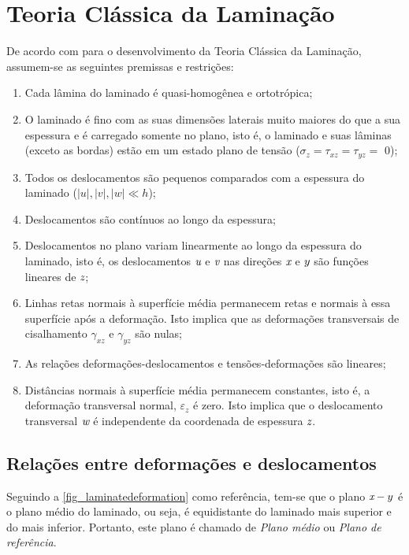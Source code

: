 \section{Teoria Clássica da Laminação}
De acordo com \cite{daniel2006engineering} para o desenvolvimento da Teoria Clássica da Laminação, assumem-se as seguintes premissas e restrições:
\begin{enumerate}
  \item Cada lâmina do laminado é quasi-homogênea e ortotrópica;
	\item O laminado é fino com as suas dimensões laterais muito maiores do que a sua espessura e é carregado somente no plano, isto é, o laminado e suas lâminas (exceto as bordas) estão em um estado plano de tensão ($\sigma_z = \tau_{xz} = \tau_{yz} =  $ 0);
	\item Todos os deslocamentos são pequenos comparados com a espessura do laminado ($|u|,|v|,|w| \ll h$);
	\item Deslocamentos são contínuos ao longo da espessura;
	\item Deslocamentos no plano variam linearmente ao longo da espessura do laminado, isto é, os deslocamentos $\emph u$ e $\emph v$ nas direções $\emph x$ e $\emph y$ são funções lineares de $\emph z$;
	\item Linhas retas normais à superfície média permanecem retas e normais à essa superfície após a deformação. Isto implica que as deformações transversais de cisalhamento $\gamma_{xz}$ e $\gamma_{yz}$ são nulas;
	\item As relações deformações-deslocamentos e tensões-deformações são lineares;
	\item Distâncias normais à superfície média permanecem constantes, isto é, a deformação transversal normal, $\varepsilon_{z}$ é zero. Isto implica que o deslocamento transversal $\emph w$ é independente da coordenada de espessura $\emph z$.
\end{enumerate}

\subsection{Relações entre deformações e deslocamentos}
Seguindo a \autoref{fig_laminatedeformation} como referência, tem-se que o plano $\emph x-y$ é o plano médio do laminado, ou seja, é equidistante do laminado mais superior e do mais inferior. Portanto, este plano é chamado de \emph{Plano médio} ou \emph{Plano de referência}.

